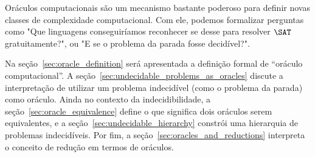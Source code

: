 Oráculos computacionais são um mecanismo bastante poderoso
para definir novas classes de complexidade computacional.
Com ele,
podemos formalizar perguntas como
"Que linguagens conseguiríamos reconhecer
se desse para resolver $\SAT$ gratuitamente?",
ou "E se o problema da parada fosse decidível?".

Na seção~\ref{sec:oracle_definition} será apresentada a definição formal
de ``oráculo computacional''.
A seção~\ref{sec:undecidable_problems_as_oracles}
discute a interpretação de utilizar um problema indecidível
(como o problema da parada)
como oráculo.
Ainda no contexto da indecidibilidade,
a seção~\ref{sec:oracle_equivalence} define o que significa
dois oráculos serem equivalentes,
e a seção~\ref{sec:undecidable_hierarchy}
constrói uma hierarquia de problemas indecidíveis.
Por fim,
a seção~\ref{sec:oracles_and_reductions}
interpreta o conceito de redução em termos de oráculos.
